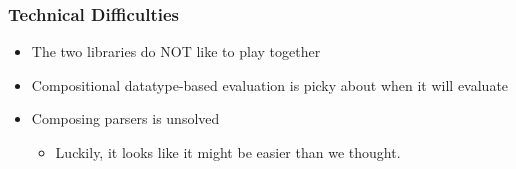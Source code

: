 \documentclass[bigger]{beamer}
\begin{document}
\begin{frame}
\frametitle{Technical Difficulties}
\label{sec-4}



\begin{itemize}
\item The two libraries do NOT like to play together
\item Compositional datatype-based evaluation is picky about when it will evaluate
\item Composing parsers is unsolved
\begin{itemize}
\item Luckily, it looks like it might be easier than we thought.
\end{itemize}
\end{itemize}
\end{frame}
\end{document}
